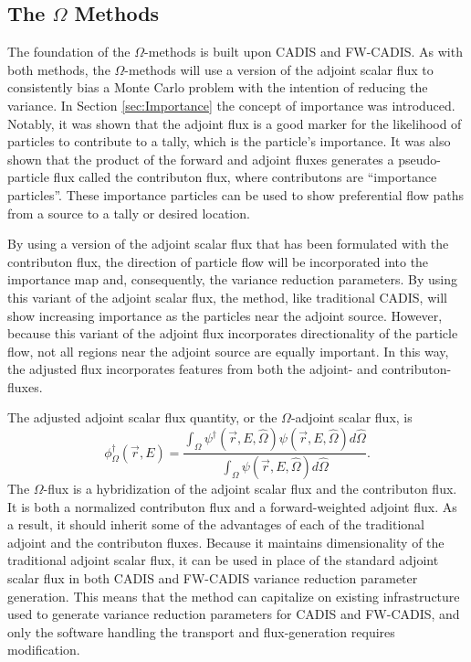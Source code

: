 \subsection{The $\Omega$ Methods}
\label{sec:omegaintro}

The foundation of the $\Omega$-methods is built upon CADIS and FW-CADIS. As with
both methods,
the $\Omega$-methods will use a version of the adjoint scalar flux to
consistently bias a Monte Carlo problem with the intention of reducing the
variance. In Section \ref{sec:Importance} the concept of importance was
introduced. Notably, it was shown that the adjoint flux is a good marker
for the likelihood of particles to contribute to a tally, which is the
particle's importance. It was also shown that the
product of the forward and adjoint fluxes generates a pseudo-particle flux called
the contributon flux, where contributons are ``importance particles''.
These importance particles can be used to show preferential flow paths from a
source to a tally or desired location.

By using a version of the adjoint scalar flux that has been formulated with the
contributon flux, the direction of particle flow will be incorporated into the
importance map and, consequently, the
variance reduction parameters. By using this variant of the adjoint scalar flux,
the method, like traditional CADIS, will show increasing importance as the
particles near the adjoint source. However, because this variant of the adjoint
flux incorporates directionality of the particle flow, not all regions near the
adjoint source are equally important. In this way, the adjusted flux
incorporates features from both the adjoint- and contributon- fluxes.

The adjusted adjoint scalar flux quantity, or the $\Omega$-adjoint
scalar flux, is
%
\begin{equation}
  \phi^{\dagger}_{\Omega}(\vec {r} ,E)  = \frac{\int_{\Omega}{\psi^{\dagger}
                             (\vec{r}, E, \hat\Omega)
                             \psi(\vec{r}, E, \hat\Omega)} d\hat{\Omega}}
                             {\int_{\Omega}\psi(\vec{r}, E, \hat\Omega)
                             d\hat{\Omega}}.
\label{eq:omega_basic}
\end{equation}
%
The $\Omega$-flux is a hybridization of the adjoint scalar flux and the contributon
flux. It is both a normalized contributon flux and a forward-weighted
adjoint flux. As a result, it should inherit some of the advantages of
each of the traditional
adjoint and the contributon fluxes. Because it maintains dimensionality of the
traditional adjoint scalar flux, it can be used in place of the standard adjoint
scalar flux in both
CADIS and FW-CADIS variance reduction parameter generation.
This means that the method can capitalize on existing infrastructure used to
generate variance reduction parameters for CADIS and FW-CADIS, and only the
software handling the transport and flux-generation requires modification.

